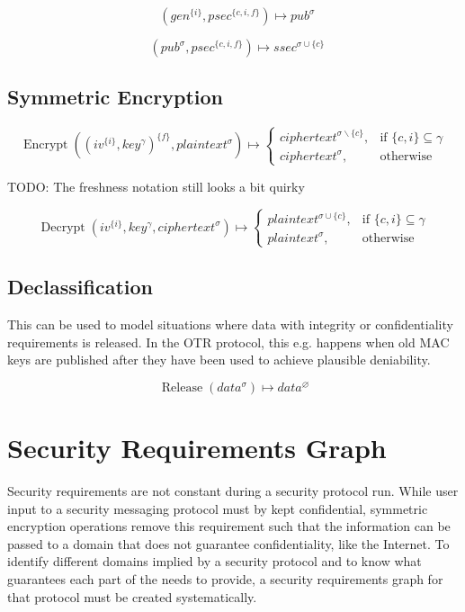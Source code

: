 \documentclass[a4paper]{article}
\DeclareMathOperator{\enc}{Encrypt}
\DeclareMathOperator{\dec}{Decrypt}
\DeclareMathOperator{\dhsec}{DH_{Sec}}
\DeclareMathOperator{\dhpub}{DH_{Pub}}
\DeclareMathOperator{\release}{Release}
\newcommand{\TODO}[1]{\small\noindent\color{red} TODO: #1\color{black}}
\newcommand{\emptysec}{\varnothing}
\newcommand{\secminus}{\smallsetminus}
\begin{document}
$$\dhpub(gen^{\{i\}}, psec^{\{c,i,f\}}) \mapsto pub^\sigma$$

$$\dhsec(pub^\sigma, psec^{\{c,i,f\}}) \mapsto ssec^{\sigma\cup\{c\}} $$

\subsection{Symmetric Encryption}

\begin{equation*}
    \enc((iv^{\{i\}}, key^\gamma)^{\{f\}}, plaintext^\sigma) \mapsto
    \begin{cases}
        ciphertext^{\sigma\secminus\{c\}}, & \text{if $\{c,i\} \subseteq \gamma$} \\
        ciphertext^{\sigma},               & \text{otherwise}
    \end{cases}
\end{equation*}

\TODO{The freshness notation still looks a bit quirky}

\begin{equation*}
    \dec(iv^{\{i\}}, key^\gamma, ciphertext^\sigma) \mapsto
    \begin{cases}
        plaintext^{\sigma\cup\{c\}}, & \text{if $\{c,i\} \subseteq \gamma$} \\
        plaintext^{\sigma},          & \text{otherwise}
    \end{cases}
\end{equation*}

\subsection{Declassification}

This can be used to model situations where data with integrity or
confidentiality requirements is released. In the OTR protocol, this e.g.
happens when old MAC keys are published after they have been used to achieve
plausible deniability.

$$\release(data^\sigma) \mapsto data^\emptysec $$

\section{Security Requirements Graph}

Security requirements are not constant during a security protocol run. While
user input to a security messaging protocol must by kept confidential,
symmetric encryption operations remove this requirement such that the
information can be passed to a domain that does not guarantee confidentiality,
like the Internet. To identify different domains implied by a security protocol
and to know what guarantees each part of the needs to provide, a security
requirements graph for that protocol must be created systematically.
\end{document}
